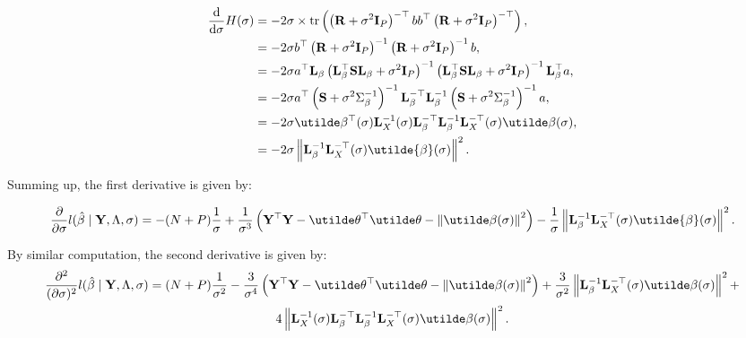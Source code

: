 \documentclass[10pt]{article}
\begin{document}
\begin{align*}
\frac{\mathrm{d}}{\mathrm{d}\sigma}
H(\sigma) & = -2\sigma\times \mathrm{tr}\left(\left({\bf
    R} + \sigma^2{\bf I}_P\right)^{-\top}b b^\top \left({\bf
    R} + \sigma^2{\bf I}_P\right)^{-\top}\right), \\
& = -2\sigma b^\top \left({\bf
    R} + \sigma^2{\bf I}_P\right)^{-1} \left({\bf
    R} + \sigma^2{\bf I}_P\right) ^{-1} b, \\
& = -2\sigma a^\top {\bf L}_\beta\left({\bf L}_\beta^\top{\bf S}{\bf
    L}_\beta + \sigma^2{\bf I}_P\right)^{-1}\left({\bf L}_\beta^\top{\bf S}{\bf
    L}_\beta + \sigma^2{\bf I}_P\right)^{-1}{\bf L}_\beta^\top a, \\
& = -2\sigma a^\top\left({\bf S} +
  \sigma^2\Sigma_\beta^{-1}\right)^{-1} {\bf L}_\beta^{-\top}{\bf
  L}_\beta^{-1} \left({\bf S} +
  \sigma^2\Sigma_\beta^{-1}\right)^{-1} a, \\
& = -2\sigma \utilde\beta^\top(\sigma){\bf L}_X^{-1}(\sigma){\bf
  L}_\beta^{-\top} {\bf L}_\beta^{-1} {\bf L}_X^{-\top}(\sigma)
\utilde\beta(\sigma), \\
& = -2\sigma \left\|{\bf L}_\beta^{-1}{\bf
  L}_X^{-\top}(\sigma)\utilde{\beta}(\sigma) \right\|^2.
\end{align*}

Summing up, the first derivative is given by:

\begin{equation*}
\frac{\partial}{\partial\sigma} l(\hat\beta \mid {\bf Y}, \Lambda,
\sigma ) = -(N+P)\frac{1}{\sigma} + \frac{1}{\sigma^3}\left({\bf Y}^\top{\bf
    Y}-\utilde\theta^\top\utilde\theta
  -\left\|\utilde\beta(\sigma)\right\|^2\right) -
\frac{1}{\sigma}\left\|{\bf L}_\beta^{-1}{\bf
  L}_X^{-\top}(\sigma)\utilde{\beta}(\sigma) \right\|^2.
\end{equation*}

By similar computation, the second derivative is given by:
\begin{multline*}
\frac{\partial^2}{(\partial\sigma)^2}
l(\hat\beta \mid {\bf Y}, \Lambda, \sigma) =
(N+P) \frac{1}{\sigma^2} - \frac{3}{\sigma^4} \left({\bf Y}^\top{\bf
    Y}-\utilde\theta^\top\utilde\theta
  -\left\|\utilde\beta(\sigma)\right\|^2\right) +
\frac{3}{\sigma^2}\left\| {\bf L}_\beta^{-1}{\bf
    L}_X^{-\top}(\sigma)\utilde\beta(\sigma) \right\|^2 + \\
4\left\| {\bf L}_X^{-1}(\sigma){\bf L}_\beta^{-\top} {\bf L}_\beta^{-1}{\bf
    L}_X^{-\top}(\sigma)\utilde\beta(\sigma) \right\|^2.
\end{multline*}
\end{document}
